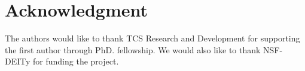 \documentclass[conference]{IEEEtran}
\begin{document}
\section*{Acknowledgment}
The authors would like to thank TCS Research and Development for supporting the first author through PhD. fellowship. We would also like to thank NSF- DEITy for funding the project.


\end{document}
